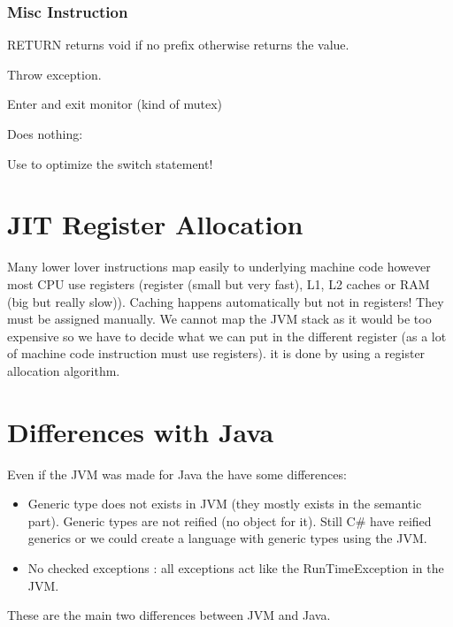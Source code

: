 \subsubsection{Misc Instruction}
\theoremstyle{definition}
\begin{definition}[RETURN]
    [A/F/D/I/L]RETURN returns void if no prefix otherwise returns the value.
\end{definition}
\theoremstyle{definition}
\begin{definition}[ATHROW]
    Throw exception.
\end{definition}
\theoremstyle{definition}
\begin{definition}
    Enter and exit monitor (kind of mutex)
\end{definition}
\theoremstyle{definition}
\begin{definition}[NOP]
    Does nothing:
\end{definition}
\theoremstyle{definition}
\begin{definition}
    Use to optimize the switch statement!
\end{definition}

\section{JIT Register Allocation}
Many lower lover instructions map easily to underlying machine code however most
CPU use registers (register (small but very fast), L1, L2 caches or RAM (big but
really slow)). Caching happens automatically but not in registers! They must be
assigned manually. We cannot map the JVM stack as it would be too expensive so
we have to decide what we can put in the different register (as a lot of machine
code instruction must use registers). it is done by using a register allocation
algorithm.

\section{Differences with Java}
Even if the JVM was made for Java the have some differences:
\begin{itemize}
    \item Generic type does not exists in JVM (they mostly exists in the
    semantic part). Generic types are not reified (no object for it). Still C\#
    have reified generics or we could create a language with generic types using
    the JVM.
    \item No checked exceptions : all exceptions act like the RunTimeException
    in the JVM.
\end{itemize}
These are the main two differences between JVM and Java.

